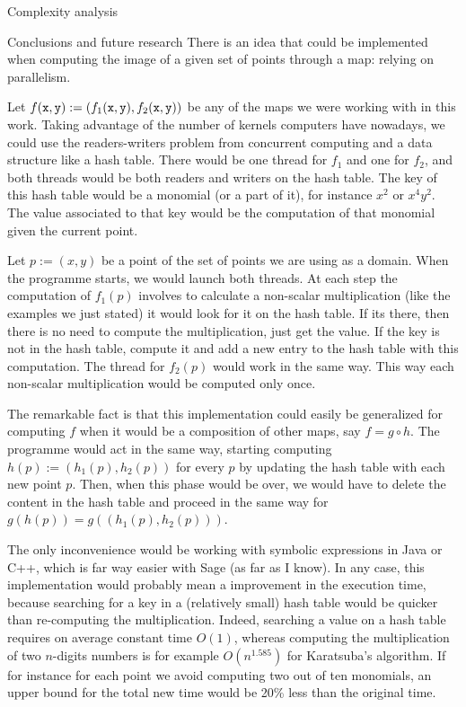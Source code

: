 \documentclass[11pt, a4paper, english, twoside, notitlepage, openright]{report}
\begin{document}
\begin{chapter}{Complexity analysis}
\begin{section}{Conclusions and future research}
There is an idea that could be implemented when computing the image of a given set of points through a map: relying on parallelism.

Let $f({\tt x},{\tt y}):=(f_1({\tt x},{\tt y}),f_2({\tt x},{\tt y}))$ be any of the maps we were working with in this work. Taking advantage of the number of kernels computers have nowadays, we could use the readers-writers problem from concurrent computing and a data structure like a hash table. There would be one thread for $f_1$ and one for $f_2$, and both threads would be both readers and writers on the hash table. The key of this hash table would be a monomial (or a part of it), for instance $x^2$ or $x^4y^2$. The value associated to that key would be the computation of that monomial given the current point.

Let $p:=(x,y)$ be a point of the set of points we are using as a domain. When the programme starts, we would launch both threads. At each step the computation of $f_1(p)$ involves to calculate a non-scalar multiplication (like the examples we just stated) it would look for it on the hash table. If its there, then there is no need to compute the multiplication, just get the value. If the key is not in the hash table, compute it and add a new entry to the hash table with this computation. The thread for $f_2(p)$ would work in the same way. This way each non-scalar multiplication would be computed only once.

The remarkable fact is that this implementation could easily be generalized for computing $f$ when it would be a composition of other maps, say $f=g\circ h$. The programme would act in the same way, starting computing $h(p):=(h_1(p), h_2(p))$ for every $p$ by updating the hash table with each new point $p$. Then, when this phase would be over, we would have to delete the content in the hash table and proceed in the same way for $g(h(p))= g((h_1(p), h_2(p)))$.

The only inconvenience would be working with symbolic expressions in Java or C++, which is far way easier with Sage (as far as I know). In any case, this implementation would probably mean a improvement in the execution time, because searching for a key in a (relatively small) hash table would be quicker than re-computing the multiplication. Indeed, searching a value on a hash table requires on average constant time $O(1)$, whereas computing the multiplication of two $n$-digits numbers is for example $O(n^{1.585})$ for Karatsuba's algorithm. If for instance for each point we avoid computing two out of ten monomials, an upper bound for the total new time would be 20\% less than the original time.


\end{section}
\end{chapter}
\end{document}
